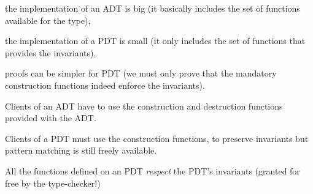 
\begin{citemize}
  \item the implementation of an ADT is big (it basically includes the set
of functions available for the type),

  \item the implementation of a PDT is small (it only includes the set of functions
that provides the invariants),
  \item proofs can be simpler for PDT (we must only prove that the
mandatory construction functions indeed enforce the invariants).
\end{citemize}


Clients of an ADT have to use the construction and destruction
functions provided with the ADT.

Clients of a PDT must use the construction functions, to preserve
invariants but pattern matching is still freely available.

All the functions defined on an PDT {\em respect} the PDT's invariants
(granted for free by the type-checker!)

